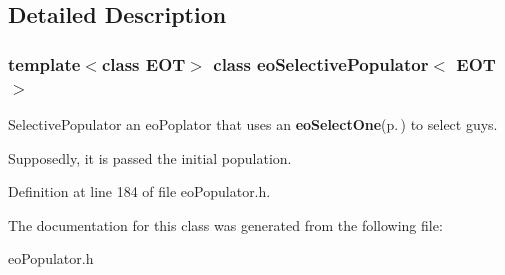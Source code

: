 \subsection{Detailed Description}
\subsubsection*{template$<$class EOT$>$ class eo\-Selective\-Populator$<$ EOT $>$}

Selective\-Populator an eo\-Poplator that uses an {\bf eo\-Select\-One}{\rm (p.\,\pageref{classeo_select_one})} to select guys. 

Supposedly, it is passed the initial population. 



Definition at line 184 of file eo\-Populator.h.

The documentation for this class was generated from the following file:\begin{CompactItemize}
\item 
eo\-Populator.h\end{CompactItemize}

